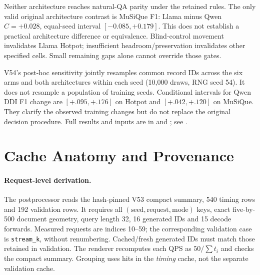 Neither architecture reaches natural-QA parity under the retained rules. The
only valid original architecture contrast is MuSiQue F1: Llama minus Qwen
$C=+0.028$, equal-seed interval $[-0.085,+0.179]$. This does not establish a
practical architecture difference or equivalence. Blind-control movement
invalidates Llama Hotpot; insufficient headroom/preservation invalidates other
specified cells. Small remaining gaps alone cannot override those gates.

V54's post-hoc sensitivity jointly resamples common record IDs across the six
arms and both architectures within each seed (10,000 draws, RNG seed 54).
It does not resample a population of training seeds. Conditional intervals for
Qwen DDI F1 change are $[+.095,+.176]$ on Hotpot and $[+.042,+.120]$ on MuSiQue.
They clarify the observed training changes but do not replace the original
decision procedure. Full results and inputs are in
 and
; see .

\newpage
\section{Cache Anatomy and Provenance}
\label{app:cache}

\paragraph{Request-level derivation.}
The postprocessor reads the hash-pinned V53 compact summary, 540 timing rows
and 192 validation rows. It requires all $(\mathrm{seed},\mathrm{request},
\mathrm{mode})$ keys, exact five-by-500 document geometry, query length 32,
16 generated IDs and 15 decode forwards. Measured requests are indices 10--59;
the corresponding validation case is \texttt{stream\_k}, without renumbering.
Cached/fresh generated IDs must match those retained in validation. The
renderer recomputes each QPS as $50/\sum t_i$ and checks the compact summary.
Grouping uses hits in the \emph{timing} cache, not the separate validation cache.

\begin{table}[H]
\centering\small
\caption{Post-hoc measured hit bins. Cache/fresh milliseconds are medians on
matched requests; the last column is the median of within-request fresh/cache
latency ratios, not the ratio of medians. Equal IDs counts exact 16-token
sequence agreement. Small bins and unequal seed composition preclude a causal
hit-rate effect. No request-level confidence intervals are asserted.}
\end{table}

